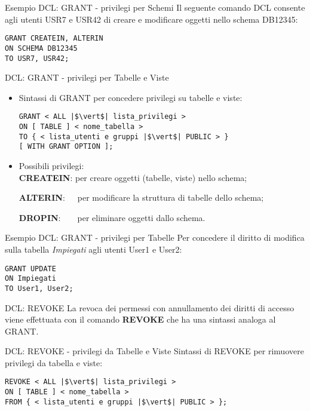 %
\begin{frame}[fragile]{Esempio DCL: GRANT - privilegi per Schemi}
Il seguente comando DCL consente agli utenti USR7 e USR42 di creare e modificare oggetti nello schema DB12345:
\begin{lstlisting}
GRANT CREATEIN, ALTERIN
ON SCHEMA DB12345
TO USR7, USR42;
\end{lstlisting}
\end{frame}
%
\begin{frame}[fragile]{DCL: GRANT - privilegi per Tabelle e Viste}
\begin{itemize}
\item Sintassi di GRANT per concedere privilegi su tabelle e viste:
\begin{lstlisting}
GRANT < ALL |$\vert$| lista_privilegi >
ON [ TABLE ] < nome_tabella >
TO { < lista_utenti e gruppi |$\vert$| PUBLIC > }
[ WITH GRANT OPTION ];
\end{lstlisting}
\item Possibili privilegi:
\\\textbf{CREATEIN}: per creare oggetti (tabelle, viste) nello schema;

\textbf{ALTERIN}:~~~per modificare la struttura di tabelle dello schema;

\textbf{DROPIN}:~~~~per eliminare oggetti dallo schema.
\end{itemize}
\end{frame}
%
\begin{frame}[fragile]{Esempio DCL: GRANT - privilegi per Tabelle}
Per concedere il diritto di modifica sulla tabella \textit{Impiegati} agli utenti User1 e User2:
\begin{lstlisting}
GRANT UPDATE
ON Impiegati
TO User1, User2;
\end{lstlisting}
\end{frame}
%
\begin{frame}[fragile]{DCL: REVOKE}
La revoca dei permessi con annullamento dei diritti di accesso viene effettuata con il comando \textbf{REVOKE} che ha una sintassi analoga al GRANT.
\end{frame}
\begin{frame}[fragile]{DCL: REVOKE - privilegi da Tabelle e Viste}
Sintassi di REVOKE per rimuovere privilegi da tabella e viste:
\begin{lstlisting}
REVOKE < ALL |$\vert$| lista_privilegi >
ON [ TABLE ] < nome_tabella >
FROM { < lista_utenti e gruppi |$\vert$| PUBLIC > };
\end{lstlisting}
\end{frame}
